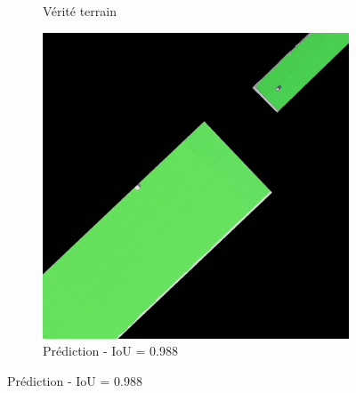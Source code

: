 \begin{figure}[H]
\begin{subfigure}{0.32\textwidth}
    \caption{Vérité terrain}
\end{subfigure}
\hfill
\begin{subfigure}{0.32\textwidth}
    \includegraphics[width=\textwidth]{02-main//figures/ch4/kfold_ensembles/unetplusplus_tu-efficientnetv2_rw_s.ra2_in1k/best_cases/best_4_iou0.988_24961121_tile_15_10_cc6553_overlay_pred.png}
    \caption{Prédiction - IoU = 0.988}
\end{subfigure}

\vspace{0.35cm}


\end{figure}
